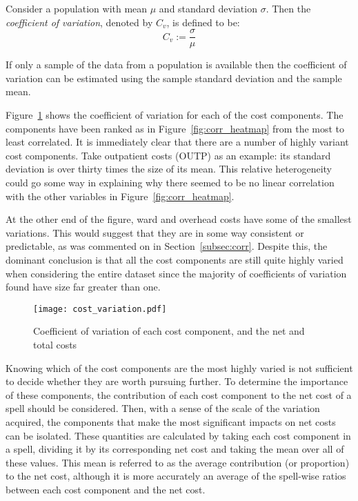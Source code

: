 \begin{definition}
    Consider a population with mean \(\mu\) and standard deviation \(\sigma\).
    Then the \emph{coefficient of variation}, denoted by \(C_v\), is defined to
    be:
    \begin{equation}\label{eq:coeff_var}
        C_{v} := \frac{\sigma}{\mu}
    \end{equation}

    If only a sample of the data from a population is available then the
    coefficient of variation can be estimated using the sample standard
    deviation and the sample mean.
\end{definition}

Figure~\ref{fig:cost_variation} shows the coefficient of variation for each of
the cost components. The components have been ranked as in
Figure~\ref{fig:corr_heatmap} from the most to least correlated. It is
immediately clear that there are a number of highly variant cost components.
Take outpatient costs (OUTP) as an example: its standard deviation is over
thirty times the size of its mean. This relative heterogeneity could go some way
in explaining why there seemed to be no linear correlation with the other
variables in Figure~\ref{fig:corr_heatmap}.

At the other end of the figure, ward and overhead costs have some of the
smallest variations. This would suggest that they are in some way consistent or
predictable, as was commented on in Section~\ref{subsec:corr}. Despite this, the
dominant conclusion is that all the cost components are still quite highly
varied when considering the entire dataset since the majority of coefficients of
variation found have size far greater than one. 

\begin{figure}[h]
    \centering
    \texttt{[image: cost\_variation.pdf]}
    \caption{%
        Coefficient of variation of each cost component, and the net and total
        costs
    }\label{fig:cost_variation}
\end{figure}

Knowing which of the cost components are the most highly varied is not
sufficient to decide whether they are worth pursuing further. To determine the
importance of these components, the contribution of each
cost component to the net cost of a spell should be considered. Then, with a
sense of the scale of the variation acquired, the components that make the most
significant impacts on net costs can be isolated. These quantities are
calculated by taking each cost component in a spell, dividing it by its
corresponding net cost and taking the mean over all of these values. This mean
is referred to as the average contribution (or proportion) to the net cost,
although it is more accurately an average of the spell-wise ratios between each
cost component and the net cost.


